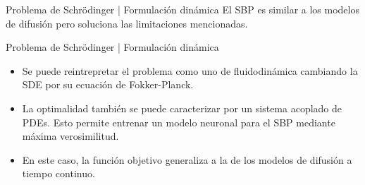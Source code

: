 \documentclass[aspectratio=43, 10pt]{beamer}
\begin{document}
\begin{frame}{Problema de Schrödinger | Formulación dinámica}
    El SBP es similar a los modelos de difusión pero soluciona las limitaciones mencionadas.

\end{frame}

\begin{frame}{Problema de Schrödinger | Formulación dinámica}
\begin{itemize}
    \item<2> Se puede reintrepretar el problema como uno de fluidodinámica cambiando la SDE por su ecuación de Fokker-Planck.
    \item<3> La optimalidad también se puede caracterizar por un sistema acoplado de PDEs. Esto permite entrenar un modelo neuronal para el SBP mediante máxima verosimilitud.
    \item<4> En este caso, la función objetivo generaliza a la de los modelos de difusión a tiempo continuo.
\end{itemize}

\end{frame}
\end{document}
